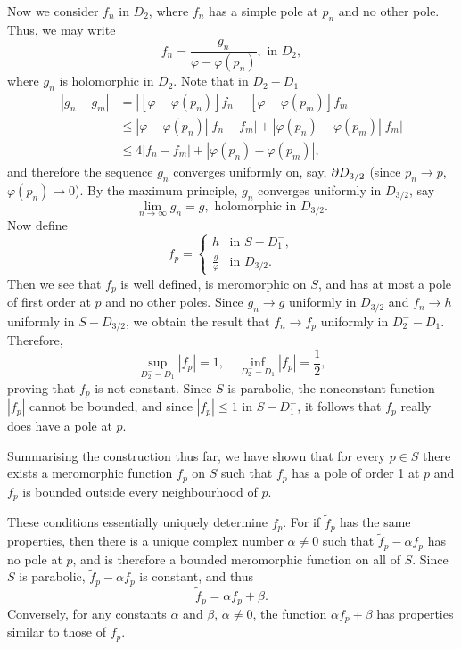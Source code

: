 \documentclass[a4paper,11pt]{article}
\begin{document}
\begin{mdframed}[skipbelow=1ex]
  Now we consider $f_n$ in $D_2$, where $f_n$ has a simple pole at
  $p_n$ and no other pole.  Thus, we may write
  $$
  f_n = \frac{g_n}{\varphi - \varphi(p_n)}, \text{ in } D_2,
  $$
  where $g_n$ is holomorphic in $D_2$.  Note that in $D_2 - D_1^-$
  $$
  \begin{aligned}
    |g_n - g_m|
    &= |[\varphi-\varphi(p_n)]f_n - [\varphi-\varphi(p_m)]f_m|\\
    &\le |\varphi-\varphi(p_n)||f_n-f_m| 
    + |\varphi(p_n)-\varphi(p_m)||f_m|\\
    &\le 4|f_n - f_m| + |\varphi(p_n) - \varphi(p_m)|,
  \end{aligned}
  $$
  and therefore the sequence $g_n$ converges uniformly on, say, $\partial
  D_{3/2}$ (since $p_n \to p$, $\varphi(p_n) \to 0$).  By the maximum
  principle, $g_n$ converges uniformly in $D_{3/2}$, say
  $$
  \lim_{n\to \infty} g_n = g, \text{ holomorphic  in } D_{3/2}.
  $$
  Now define
  $$
  f_p =
  \begin{cases}
    h &\text{in }S-D_1^-,\\
    \frac{g}{\varphi} &\text{in }D_{3/2}.
  \end{cases}
  $$
  Then we see that $f_p$ is well defined, is meromorphic on $S$, and
  has at most a pole of first order at $p$ and no other poles.  Since
  $g_n \to g$ uniformly in $D_{3/2}$ and $f_n \to h$ uniformly in $S -
  D_{3/2}$, we obtain the result that $f_n \to f_p$ uniformly in
  $D_2^- - D_1$.  Therefore,
  $$
  \sup_{D_2^- - D_1} |f_p| = 1,\quad
  \inf_{D_2^- - D_1} |f_p| = \frac{1}{2},
  $$
  proving that $f_p$ is not constant.  Since $S$ is parabolic, the
  nonconstant function $|f_p|$ cannot be bounded, and since $|f_p| \le
  1$ in $S-D_1^-$, it follows that $f_p$ really does have a pole at
  $p$.

  Summarising the construction thus far, we have shown that for every
  $p \in S$ there exists a meromorphic function $f_p$ on $S$ such that
  $f_p$ has a pole of order 1 at $p$ and $f_p$ is bounded outside
  every neighbourhood of $p$.

  These conditions essentially uniquely determine $f_p$.  For if
  $\tilde{f}_p$ has the same properties, then there is a unique
  complex number $\alpha \ne 0$ such that $\tilde{f}_p - \alpha f_p$
  has no pole at $p$, and is therefore a bounded meromorphic function
  on all of $S$.  Since $S$ is parabolic, $\tilde{f}_p - \alpha f_p$
  is constant, and thus
  $$
  \tilde{f}_p = \alpha f_p + \beta.
  $$
  Conversely, for any constants $\alpha$ and $\beta$, $\alpha \ne 0$,
  the function $\alpha f_p + \beta$ has properties similar to those of
  $f_p$.


\end{mdframed}
\end{document}
